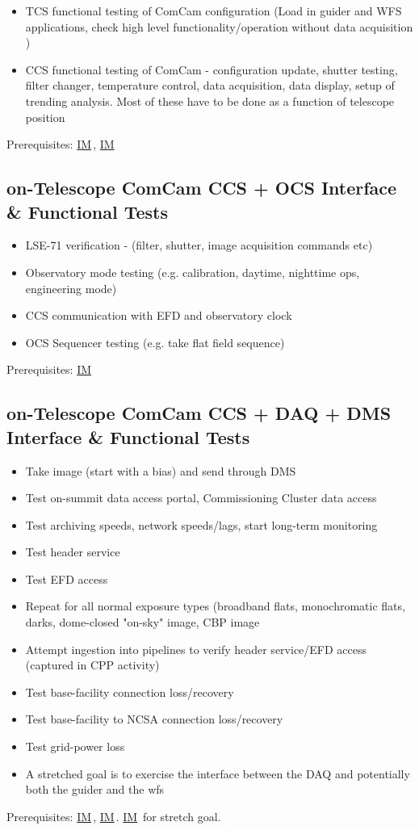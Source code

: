 \documentclass[SE,authoryear,toc]{lsstdoc}
\newcommand{\IM}[1]{\hyperref[IM:#1]{\color{blue}IM$_{\text{\csname nameIM#1\endcsname}}$}}
\begin{document}
\begin{itemize}
\item
  TCS functional testing of ComCam configuration (Load in guider and WFS applications, check high level functionality/operation without data acquisition )
\item
  CCS functional testing of ComCam - configuration update, shutter testing, filter changer, temperature control, data acquisition, data display, setup of trending analysis. Most of these have to be done as a function of telescope position
\end{itemize}
Prerequisites: \IM{b}, \IM{g}

\subsection{on-Telescope ComCam CCS + OCS Interface \& Functional Tests}

\begin{itemize}
\item LSE-71 verification - (filter, shutter, image acquisition commands etc)
\item Observatory mode testing (e.g. calibration, daytime, nighttime ops, engineering mode)
\item CCS communication with EFD and observatory clock
\item OCS Sequencer testing (e.g. take flat field sequence)
\end{itemize}
Prerequisites: \IM{b}

\subsection{on-Telescope ComCam CCS + DAQ + DMS Interface \& Functional Tests}
\begin{itemize}
\item Take image (start with a bias) and send through DMS
\item Test on-summit data access portal, Commissioning Cluster data access
\item Test archiving speeds, network speeds/lags, start long-term monitoring
\item Test header service
\item Test EFD access
\item Repeat for all normal exposure types (broadband flats, monochromatic flats, darks, dome-closed "on-sky" image, CBP image
\item Attempt ingestion into pipelines to verify header service/EFD access (captured in CPP activity)
\item Test base-facility connection loss/recovery
\item Test base-facility to NCSA connection loss/recovery
\item Test grid-power loss
\item A stretched goal is to exercise the interface between the DAQ and potentially both the guider and the wfs
\end{itemize}
Prerequisites: \IM{b}, \IM{cbp}.  \IM{g} for stretch goal.
\end{document}
